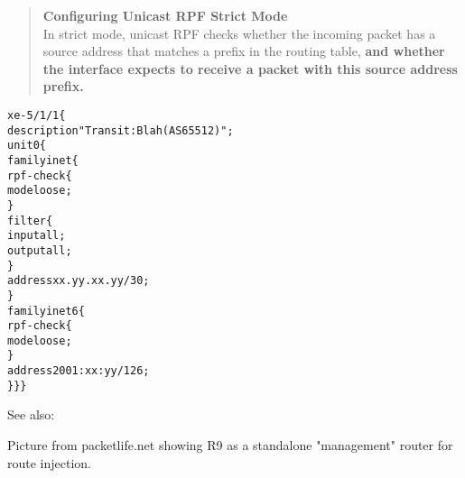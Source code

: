 \documentclass[Screen16to9,17pt]{foils}
\begin{document}






\begin{quote}
{\bf Configuring Unicast RPF Strict Mode}\\
In strict mode, unicast RPF checks whether the incoming packet has a source address that matches a prefix in the routing table, {\bf and whether the interface expects to receive a packet with this source address prefix.}
\end{quote}



\begin{alltt}\footnotesize
xe-5/1/1 \{
    description "Transit: Blah (AS65512)";
    unit 0 \{
        family inet \{
            rpf-check \{
                mode loose;
            \}
            filter \{
                input all;
                output all;
            \}
            address xx.yy.xx.yy/30;
        \}
        family inet6 \{
            rpf-check \{
                mode loose;
            \}
            address 2001:xx:yy/126;
\} \} \}
\end{alltt}

See also: {\small{}}



Picture from packetlife.net showing  R9 as a standalone "management" router for route injection.

{\footnotesize
{}\\
}
\end{document}
